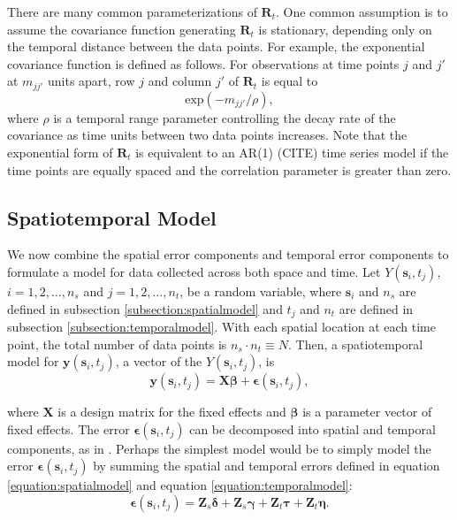 \documentclass[]{interact}
\theoremstyle{plain}%
\theoremstyle{definition}
\theoremstyle{remark}
\begin{document}
There are many common parameterizations of \(\mathbf{R}_{t}\). One
common assumption is to assume the covariance function generating
\(\mathbf{R}_t\) is stationary, depending only on the temporal distance
between the data points. For example, the exponential covariance
function is defined as follows. For observations at time points \(j\)
and \(j'\) at \(m_{jj'}\) units apart, row \(j\) and column \(j'\) of
\(\mathbf{R}_{t}\) is equal to \mbox{} \begin{equation}
\label{equation:tempcov}
\text{exp}(-m_{jj'} / \rho),
\end{equation} \noindent where \(\rho\) is a temporal range parameter
controlling the decay rate of the covariance as time units between two
data points increases. Note that the exponential form of
\(\mathbf{R}_t\) is equivalent to an AR(1) (CITE) time series model if
the time points are equally spaced and the correlation parameter is
greater than zero.

\subsection{Spatiotemporal Model}

We now combine the spatial error components and temporal error
components to formulate a model for data collected across both space and
time. Let \(Y(\mathbf{s}_{i}, t_j)\), \(i = 1, 2, \ldots, n_{s}\) and
\(j = 1, 2, \ldots, n_{t}\), be a random variable, where
\(\mathbf{s}_i\) and \(n_s\) are defined in subsection
\ref{subsection:spatialmodel} and \(t_j\) and \(n_t\) are defined in
subsection \ref{subsection:temporalmodel}. With each spatial location at
each time point, the total number of data points is
\(n_{s} \cdot n_{t} \equiv N\). Then, a spatiotemporal model for
\(\mathbf{y}(\mathbf{s}_{i}, t_j)\), a vector of the
\(Y(\mathbf{s}_{i}, t_j)\), is \mbox{} \begin{equation}
\mathbf{y}(\mathbf{s}_{i}, t_j) = \mathbf{X} \bm{\beta} + \bm{\epsilon}(\mathbf{s}_{i}, t_j),
\end{equation}

\noindent where \(\mathbf{X}\) is a design matrix for the fixed effects
and \(\bm{\beta}\) is a parameter vector of fixed effects. The error
\(\bm{\epsilon}(\mathbf{s}_{i}, t_j)\) can be decomposed into spatial
and temporal components, as in \citet{dumelle2021linear}. Perhaps the
simplest model would be to simply model the error
\(\bm{\epsilon}(\mathbf{s}_{i}, t_j)\) by summing the spatial and
temporal errors defined in equation \ref{equation:spatialmodel} and
equation \ref{equation:temporalmodel}: \mbox{} \begin{equation}
\label{equation:sumcovmodel}
\bm{\epsilon}(\mathbf{s}_{i}, t_j) = \mathbf{Z}_{s} \bm{\delta} + \mathbf{Z}_{s} \bm{\gamma} + \mathbf{Z}_{t} \bm{\tau} + \mathbf{Z}_{t} \bm{\eta}.
\end{equation}
\end{document}

